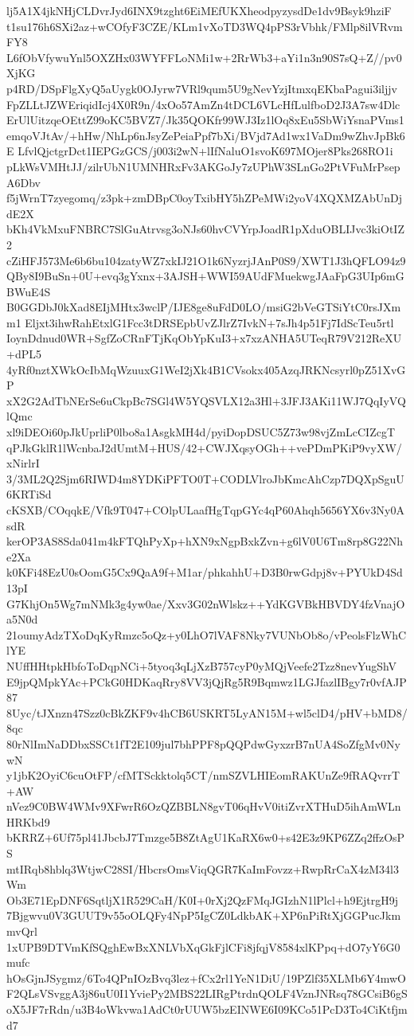 lj5A1X4jkNHjCLDvrJyd6INX9tzght6EiMEfUKXheodpyzysdDe1dv9Bsyk9hziF
t1su176h6SXi2az+wCOfyF3CZE/KLm1vXoTD3WQ4pPS3rVbhk/FMlp8ilVRvmFY8
L6fObVfywuYnl5OXZHx03WYFFLoNMi1w+2RrWb3+aYi1n3n90S7sQ+Z//pv0XjKG
p4RD/DSpFlgXyQ5aUygk0OJyrw7VRl9qum5U9gNevYzjItmxqEKbaPagui3iljjv
FpZLLtJZWEriqidIcj4X0R9n/4xOo57AmZn4tDCL6VLcHfLulfboD2J3A7sw4Dlc
ErUlUitzqeOEttZ99oKC5BVZ7/Jk35QOKfr99WJ3Iz1lOq8xEu5SbWiYsnaPVms1
emqoVJtAv/+hHw/NhLp6nJsyZePeiaPpf7bXi/BVjd7Ad1wx1VaDm9wZhvJpBk6E
LfvlQjctgrDct1IEPGzGCS/j003i2wN+lIfNaluO1svoK697MOjer8Pks268RO1i
pLkWsVMHtJJ/zilrUbN1UMNHRxFv3AKGoJy7zUPhW3SLnGo2PtVFuMrPsepA6Dbv
f5jWrnT7zyegomq/z3pk+zmDBpC0oyTxibHY5hZPeMWi2yoV4XQXMZAbUnDjdE2X
bKh4VkMxuFNBRC7SlGuAtrvsg3oNJs60hvCVYrpJoadR1pXduOBLIJvc3kiOtIZ2
cZiHFJ573Me6b6bu104zatyWZ7xkIJ21O1k6NyzrjJAnP0S9/XWT1J3hQFLO94z9
QBy8I9BuSn+0U+evq3gYxnx+3AJSH+WWI59AUdFMuekwgJAaFpG3UIp6mGBWuE4S
B0GGDbJ0kXad8EIjMHtx3wclP/IJE8ge8uFdD0LO/msiG2bVeGTSiYtC0rsJXmm1
Eljxt3ihwRahEtxlG1Fcc3tDRSEpbUvZJlrZ7IvkN+7sJh4p51Fj7IdScTeu5rtl
IoynDdnud0WR+SgfZoCRnFTjKqObYpKuI3+x7xzANHA5UTeqR79V212ReXU+dPL5
4yRf0nztXWkOcIbMqWzuuxG1WeI2jXk4B1CVsokx405AzqJRKNcsyrl0pZ51XvGP
xX2G2AdTbNErSe6uCkpBc7SGl4W5YQSVLX12a3Hl+3JFJ3AKi11WJ7QqIyVQlQmc
xl9iDEOi60pJkUprliP0lbo8a1AsgkMH4d/pyiDopDSUC5Z73w98vjZmLcCIZcgT
qPJkGklR1lWcnbaJ2dUmtM+HUS/42+CWJXqsyOGh++vePDmPKiP9vyXW/xNirlrI
3/3ML2Q2Sjm6RIWD4m8YDKiPFTO0T+CODLVlroJbKmcAhCzp7DQXpSguU6KRTiSd
cKSXB/COqqkE/Vfk9T047+COlpULaafHgTqpGYc4qP60Ahqh5656YX6v3Ny0AsdR
kerOP3AS8Sda041m4kFTQhPyXp+hXN9xNgpBxkZvn+g6lV0U6Tm8rp8G22Nhe2Xa
k0KFi48EzU0sOomG5Cx9QaA9f+M1ar/phkahhU+D3B0rwGdpj8v+PYUkD4Sd13pI
G7KhjOn5Wg7mNMk3g4yw0ae/Xxv3G02nWlskz++YdKGVBkHBVDY4fzVnajOa5N0d
21oumyAdzTXoDqKyRmzc5oQz+y0LhO7lVAF8Nky7VUNbOb8o/vPeolsFlzWhClYE
NUffHHtpkHbfoToDqpNCi+5tyoq3qLjXzB757cyP0yMQjVeefe2Tzz8nevYugShV
E9jpQMpkYAc+PCkG0HDKaqRry8VV3jQjRg5R9Bqmwz1LGJfazlIBgy7r0vfAJP87
8Uyc/tJXnzn47Szz0cBkZKF9v4hCB6USKRT5LyAN15M+wl5clD4/pHV+bMD8/8qc
80rNlImNaDDbxSSCt1fT2E109jul7bhPPF8pQQPdwGyxzrB7nUA4SoZfgMv0NywN
y1jbK2OyiC6cuOtFP/cfMTSckktolq5CT/nmSZVLHIEomRAKUnZe9fRAQvrrT+AW
nVez9C0BW4WMv9XFwrR6OzQZBBLN8gvT06qHvV0itiZvrXTHuD5ihAmWLnHRKbd9
bKRRZ+6Uf75pl41JbcbJ7Tmzge5B8ZtAgU1KaRX6w0+s42E3z9KP6ZZq2ffzOsPS
mtIRqb8hblq3WtjwC28SI/HbcrsOmsViqQGR7KaImFovzz+RwpRrCaX4zM34l3Wm
Ob3E71EpDNF6SqtljX1R529CaH/K0I+0rXj2QzFMqJGIzhN1lPlcl+h9EjtrgH9j
7Bjgwvu0V3GUUT9v55oOLQFy4NpP5IgCZ0LdkbAK+XP6nPiRtXjGGPucJkmmvQrl
1xUPB9DTVmKfSQghEwBxXNLVbXqGkFjlCFi8jfqjV8584xlKPpq+dO7yY6G0mufc
hOsGjnJSygmz/6To4QPnIOzBvq3lez+fCx2rl1YeN1DiU/19PZlf35XLMb6Y4mwO
F2QLsVSvggA3j86uU0I1YviePy2MBS22LIRgPtrdnQOLF4VznJNRsq78GCsiB6gS
oX5JF7rRdn/u3B4oWkvwa1AdCt0rUUW5bzEINWE6I09KCo51PcD3To4CiKtfjmd7
